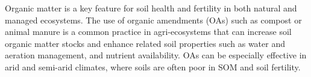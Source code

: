 Organic matter is a key feature for soil health and fertility in both natural and managed ecosystems. The use of organic amendments (OAs) such as compost or animal manure is a common practice in agri-ecosystems that can increase soil organic matter stocks and enhance related soil properties such as  water and aeration management, and nutrient availability. OAs can be especially effective in arid and semi-arid climates, where soils are often poor in SOM and soil fertility.
        